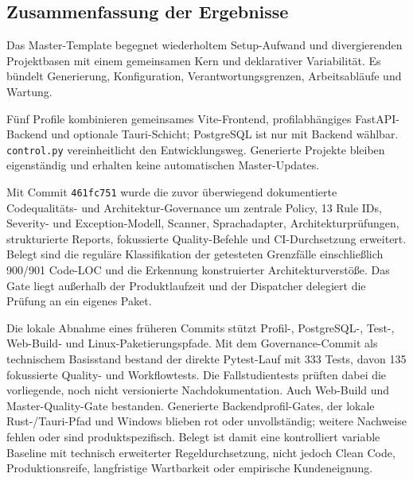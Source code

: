 \subsection{Zusammenfassung der Ergebnisse}
\label{subsec:zusammenfassung-ergebnisse}

Das Master-Template begegnet wiederholtem Setup-Aufwand und divergierenden
Projektbasen mit einem gemeinsamen Kern und deklarativer Variabilität. Es
bündelt Generierung, Konfiguration, Verantwortungsgrenzen, Arbeitsabläufe und
Wartung.

Fünf Profile kombinieren gemeinsames Vite-Frontend, profilabhängiges
FastAPI-Backend und optionale Tauri-Schicht; PostgreSQL ist nur mit Backend
wählbar. \texttt{control.py} vereinheitlicht den Entwicklungsweg. Generierte
Projekte bleiben eigenständig und erhalten keine automatischen Master-Updates.

Mit Commit \texttt{461fc751} wurde die zuvor überwiegend dokumentierte
Codequalitäts- und Architektur-Governance um zentrale Policy, 13 Rule IDs,
Severity- und Exception-Modell, Scanner, Sprachadapter, Architekturprüfungen,
strukturierte Reports, fokussierte Quality-Befehle und CI-Durchsetzung
erweitert. Belegt sind die reguläre Klassifikation der getesteten Grenzfälle
einschließlich 900/901 Code-LOC und die Erkennung konstruierter
Architekturverstöße. Das Gate liegt außerhalb der Produktlaufzeit und der
Dispatcher delegiert die Prüfung an ein eigenes Paket.

Die lokale Abnahme eines früheren Commits stützt Profil-, PostgreSQL-, Test-,
Web-Build- und Linux-Paketierungspfade. Mit dem Governance-Commit als
technischem Basisstand bestand der direkte Pytest-Lauf mit 333 Tests, davon 135
fokussierte Quality- und Workflowtests. Die Fallstudientests prüften dabei die
vorliegende, noch nicht versionierte Nachdokumentation. Auch Web-Build und
Master-Quality-Gate bestanden. Generierte Backendprofil-Gates, der lokale
Rust-/Tauri-Pfad und Windows blieben rot oder unvollständig; weitere Nachweise
fehlen oder sind produktspezifisch. Belegt ist damit eine kontrolliert variable
Baseline mit technisch erweiterter Regeldurchsetzung, nicht jedoch Clean Code,
Produktionsreife, langfristige Wartbarkeit oder empirische Kundeneignung.
